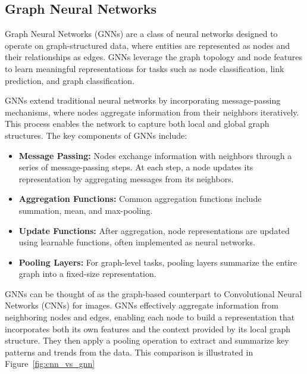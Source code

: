 \documentclass[runningheads]{llncs}
\begin{document}
\subsection{Graph Neural Networks}
\label{sss:gnn}
Graph Neural Networks (GNNs) are a class of neural networks designed to operate on graph-structured data, where entities are represented as nodes and their relationships as edges. 
GNNs leverage the graph topology and node features to learn meaningful representations for tasks such as node classification, link prediction, and graph classification.

GNNs extend traditional neural networks by incorporating message-passing mechanisms, where nodes aggregate information from their neighbors iteratively. 
This process enables the network to capture both local and global graph structures. 
The key components of GNNs include:

\begin{itemize}
    \item \textbf{Message Passing:} Nodes exchange information with neighbors through a series of message-passing steps. At each step, a node updates its representation by aggregating messages from its neighbors.
    \item \textbf{Aggregation Functions:} Common aggregation functions include summation, mean, and max-pooling.
    \item \textbf{Update Functions:} After aggregation, node representations are updated using learnable functions, often implemented as neural networks.
    \item \textbf{Pooling Layers:} For graph-level tasks, pooling layers summarize the entire graph into a fixed-size representation.
\end{itemize}

GNNs can be thought of as the graph-based counterpart to Convolutional Neural Networks (CNNs) for images. 
GNNs effectively aggregate information from neighboring nodes and edges, enabling each node to build a representation that incorporates both its own features and the context provided by its local graph structure.
They then apply a pooling operation to extract and summarize key patterns and trends from the data.
This comparison is illustrated in Figure~\ref{fig:cnn_vs_gnn}
\end{document}
